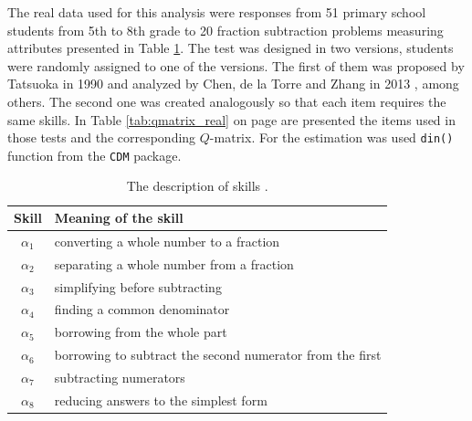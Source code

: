 \documentclass[english]{pwr_wmat_praca_dyplomowa}
\theoremstyle{plain}
\numberwithin{theorem}{chapter}
\theoremstyle{definition}
\numberwithin{theorem}{chapter}
\begin{document}
	The real data used for this analysis were responses from 51 primary school students from 5th to 8th grade to 20 fraction subtraction problems measuring attributes presented in Table \ref{tab:real_skills}. The test was designed in two versions, students were randomly assigned to one of the versions. The first of them was proposed by Tatsuoka in 1990 \cite{tatsuoka} and analyzed by Chen, de la Torre and Zhang in 2013 \cite{cdm_and_qmat_misspec}, among others. The second one was created analogously so that each item requires the same skills. In Table \ref{tab:qmatrix_real} on page \pageref{tab:qmatrix_real} are presented the items used in those tests and the corresponding $Q$-matrix. For the estimation was used \texttt{din()} function from the \texttt{CDM} package. 
	
	\begin{table}[ht]
		\centering
		\begin{tabular}{c l} 
			\hline
			{\rule{0pt}{3ex}}Skill & Meaning of the skill \\
			\hline
			{\rule{0pt}{3ex}}$\alpha_1$ & converting a whole number to a fraction \\
			$\alpha_2$ & separating a whole number from a fraction \\
			$\alpha_3$ & simplifying before subtracting \\
			$\alpha_4$ & finding a common denominator \\
			$\alpha_5$ & borrowing from the whole part \\
			$\alpha_6$ & borrowing to subtract the second numerator from the first \\
			$\alpha_7$ & subtracting numerators \\
			$\alpha_8$ & reducing answers to the simplest form \\ [0.7ex] 
			\hline
		\end{tabular}
		\caption{The description of skills \cite{fraction_subtraction}.}
		\label{tab:real_skills} 
	\end{table}
	
\end{document}
